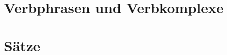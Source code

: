 \documentclass[handout,aspectratio=1610,dvipsnames]{beamer}
\begin{document}
  \section[Verbphrasen]{Verbphrasen und Verbkomplexe}
  \let\woopsi\section\let\section\subsection\let\subsection\subsubsection
  
  \let\subsection\section\let\section\woopsi

  \section[Sätze]{Sätze}
  \let\woopsi\section\let\section\subsection\let\subsection\subsubsection
  
  \let\subsection\section\let\section\woopsi
\end{document}
